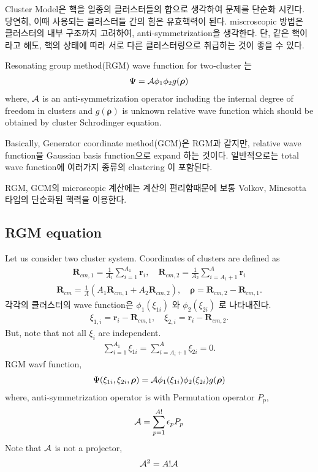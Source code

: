 \documentclass[11pt]{article}
\def\bm{\boldsymbol}
\newcommand{\bea}{\begin{eqnarray}}
\newcommand{\eea}{\end{eqnarray}}
\newcommand{\vrho}{{\bm \rho}}
\newcommand{\vr}{{\bm r}}
\newcommand{\vR}{{\bm R}}
\begin{document}
Cluster Model은 핵을 일종의 클러스터들의 합으로 생각하여 문제를 단순화 시킨다. 당연히, 이때 사용되는 
클러스터들 간의 힘은 유효핵력이 된다. miscroscopic 방법은 클러스터의 내부 구조까지 고려하여, anti-symmetrization을 
생각한다.  단, 같은 핵이라고 해도, 핵의 상태에 따라 서로 다른 클러스터링으로 취급하는 것이 좋을 수 있다. 

Resonating group method(RGM) wave function for two-cluster 는  
\bea 
\Psi={\cal A} \phi_1 \phi_2 g({\bm \rho})
\eea 
where, ${\cal A}$ is an anti-symmetrization operator including the internal degree of freedom
in clusters and $g({\bm \rho})$ is unknown relative wave function which should be obtained by 
cluster Schrodinger equation. 

Basically, Generator coordinate method(GCM)은 RGM과 같지만, relative wave function을 
Gaussian basis function으로 expand 하는 것이다. 일반적으로는 total wave function에 여러가지 종류의 
clustering 이 포함된다.

RGM, GCM의 microscopic 계산에는 계산의 편리함때문에 보통   Volkov, Minesotta 타입의 단순화된 핵력을 이용한다. 

\subsection{RGM equation}
Let us consider two cluster system. 
Coordinates of clusters are defined as
\bea 
\vR_{cm,1}=\frac{1}{A_1}\sum_{i=1}^{A_1} \vr_i,\quad 
 \vR_{cm,2}=\frac{1}{A_2}\sum_{i=A_1+1}^{A} \vr_i
\eea 
\bea 
\vR_{cm}=\frac{1}{A}(A_1\vR_{cm,1}+A_2\vR_{cm,2}),
\quad \vrho=\vR_{cm,2}-\vR_{cm,1}.
\eea 
각각의 클러스터의 wave function은 $\phi_1(\xi_{1i})$ 와 
$\phi_2(\xi_{2i})$ 로 나타내진다. 
\bea 
\xi_{1,i}=\vr_i-\vR_{cm,1}, \quad 
\xi_{2,i}=\vr_i-\vR_{cm,2}.
\eea 
But, note that not all $\xi_{i}$ are independent.
\bea 
\sum_{i=1}^{A_1}\xi_{1i}=\sum_{i=A_i+1}^{A}\xi_{2i}=0.
\eea 
RGM wavf function,
\bea 
\Psi(\xi_{1i},\xi_{2i},\vrho)
={\cal A}\phi_1(\xi_{1i})\phi_2(\xi_{2i})g(\vrho)
\eea 
where, anti-symmetrization operator is 
with Permutation operator $P_{p}$,
\bea 
{\cal A}=\sum_{p=1}^{A!}\epsilon_p P_{p}
\eea    
Note that ${\cal A}$ is not a projector,
\bea 
{\cal A}^2=A!{\cal A}
\eea 
\end{document}
